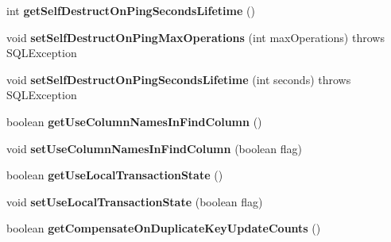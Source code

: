 \begin{DoxyCompactItemize}
int {\bfseries get\+Self\+Destruct\+On\+Ping\+Seconds\+Lifetime} ()
\item 
\mbox{\label{classcom_1_1mysql_1_1jdbc_1_1jdbc2_1_1optional_1_1_connection_wrapper_a30a06dab53aad44eac98932dc1b41db3}} 
void {\bfseries set\+Self\+Destruct\+On\+Ping\+Max\+Operations} (int max\+Operations)  throws S\+Q\+L\+Exception 
\item 
\mbox{\label{classcom_1_1mysql_1_1jdbc_1_1jdbc2_1_1optional_1_1_connection_wrapper_a225f96b63b5357d37d951ccb508e1834}} 
void {\bfseries set\+Self\+Destruct\+On\+Ping\+Seconds\+Lifetime} (int seconds)  throws S\+Q\+L\+Exception 
\item 
\mbox{\label{classcom_1_1mysql_1_1jdbc_1_1jdbc2_1_1optional_1_1_connection_wrapper_a8597b85f62ccf71b39a5ab333bbcaf35}} 
boolean {\bfseries get\+Use\+Column\+Names\+In\+Find\+Column} ()
\item 
\mbox{\label{classcom_1_1mysql_1_1jdbc_1_1jdbc2_1_1optional_1_1_connection_wrapper_a24d1914ca3551c89cee66aee01499cfa}} 
void {\bfseries set\+Use\+Column\+Names\+In\+Find\+Column} (boolean flag)
\item 
\mbox{\label{classcom_1_1mysql_1_1jdbc_1_1jdbc2_1_1optional_1_1_connection_wrapper_a5ad381a236c6c29dfcb9f1a85069e012}} 
boolean {\bfseries get\+Use\+Local\+Transaction\+State} ()
\item 
\mbox{\label{classcom_1_1mysql_1_1jdbc_1_1jdbc2_1_1optional_1_1_connection_wrapper_a8929ad8e481c8b7e88937dcf54ac5e1a}} 
void {\bfseries set\+Use\+Local\+Transaction\+State} (boolean flag)
\item 
\mbox{\label{classcom_1_1mysql_1_1jdbc_1_1jdbc2_1_1optional_1_1_connection_wrapper_a129ee2ac99316636f89a6cbd6f6b08f0}} 
boolean {\bfseries get\+Compensate\+On\+Duplicate\+Key\+Update\+Counts} ()

\end{DoxyCompactItemize}
